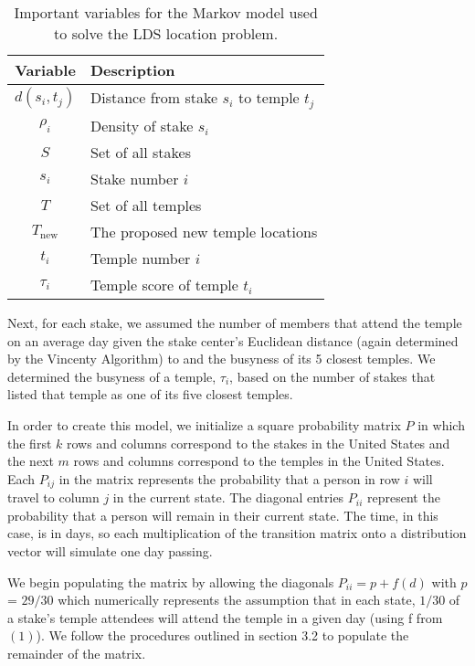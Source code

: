 \documentclass[twoside,twocolumn]{article}
\begin{document}
\begin{table}
\begin{tabular}{c | l}
Variable & Description\\
\hline
$d(s_i,t_j)$ & Distance from stake $s_i$ to temple $t_j$\\
$\rho_i$ & Density of stake $s_i$\\
$S$ & Set of all stakes\\
$s_i$ & Stake number $i$\\
$T$ & Set of all temples\\
$T_{\text{new}}$ & The proposed new temple locations\\
$t_i$ & Temple number $i$ \\
$\tau_i$ & Temple score of temple $t_i$\\
\end{tabular}
\caption{Important variables for the Markov model used to solve the LDS location problem.}
\end{table}

Next, for each stake, we assumed the number of members that attend the temple on an average day given the stake center's Euclidean distance (again determined by the Vincenty Algorithm) to and the busyness of its 5 closest temples.
We determined the busyness of a temple, $\tau_i$, based on the number of stakes that listed that temple as one of its five closest temples. %

In order to create this model, we initialize a square probability matrix $P$ in which the first $k$ rows and columns correspond to the stakes in the United States and the next $m$ rows and columns correspond to the temples in the United States.
Each $P_{ij}$ in the matrix represents the probability that a person in row $i$ will travel to column $j$ in the current state.
The diagonal entries $P_{ii}$ represent the probability that a person will remain in their current state.
The time, in this case, is in days, so each multiplication of the transition matrix onto a distribution vector will simulate one day passing.


We begin populating the matrix by allowing the diagonals $P_{ii} = p + f(d)$ with $p$ = $29/30$ which numerically represents the assumption that in each state, $1/30$ of a stake's temple attendees will attend the temple in a given day (using f from $(1)$).
We follow the procedures outlined in section 3.2 to populate the remainder of the matrix.
\end{document}
